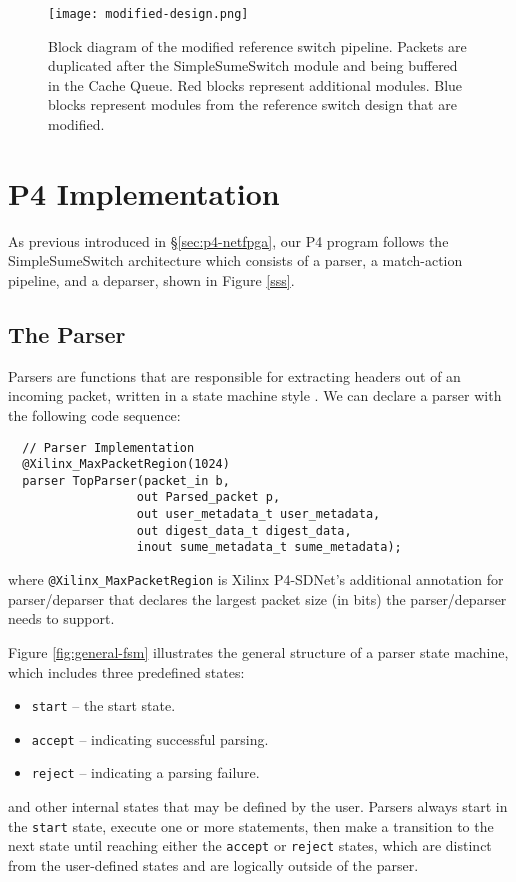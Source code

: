 \begin{figure}[!h]
	\centering
	\texttt{[image: modified-design.png]}
	\caption{Block diagram of the modified reference switch pipeline. Packets are duplicated after the SimpleSumeSwitch module and being buffered in the Cache Queue. Red blocks represent additional modules. Blue blocks represent modules from the reference switch design that are modified.}
	\label{fig:modified-design}
\end{figure}

\section{P4 Implementation}
\label{sec:sw}
As previous introduced in \S\ref{sec:p4-netfpga}, our P4 program follows the SimpleSumeSwitch architecture which consists of a parser, a match-action pipeline, and a deparser, shown in Figure \ref{sss}.

\subsection{The Parser}
Parsers are functions that are responsible for extracting headers out of an incoming packet, written in a state machine style \cite{p4spec}. We can declare a parser with the following code sequence:

{\renewcommand{\baselinestretch}{0.8}\small
	\begin{verbatim}
  // Parser Implementation
  @Xilinx_MaxPacketRegion(1024)
  parser TopParser(packet_in b, 
                  out Parsed_packet p, 
                  out user_metadata_t user_metadata,
                  out digest_data_t digest_data,
                  inout sume_metadata_t sume_metadata);
	\end{verbatim}
}
where \texttt{@Xilinx\_MaxPacketRegion} is Xilinx P4-SDNet's additional annotation for parser/deparser that declares the largest packet size (in bits) the parser/deparser needs to support.
 
Figure \ref{fig:general-fsm} illustrates the general structure of a parser state machine, which includes three predefined states: 
\begin{itemize}[leftmargin=*, noitemsep]
	\item \texttt{start} -- the start state.
	\item \texttt{accept} -- indicating successful parsing.
	\item \texttt{reject} -- indicating a parsing failure.
\end{itemize}
and other internal states that may be defined by the user. Parsers always start in the \texttt{start} state, execute one or more statements, then make a transition to the next state until reaching either the \texttt{accept} or \texttt{reject} states, which are distinct from the user-defined states and are logically outside of the parser. 


